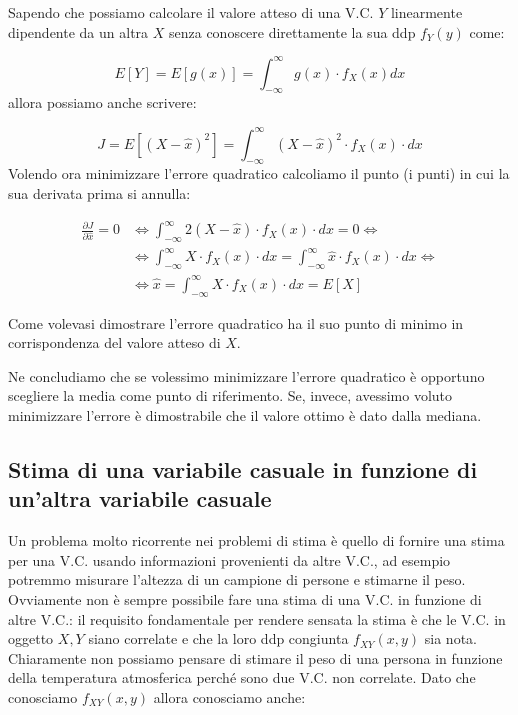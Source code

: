 \begin{dimostrazione}
Sapendo che possiamo calcolare il valore atteso di una V.C. $Y$ linearmente dipendente da un altra $X$ senza conoscere direttamente la sua ddp $f_Y(y)$ come:

  \[ E[Y]=E[g(x)]=\int_{-\infty}^{\infty} {g(x) \cdot f_X(x)dx}  \]
allora possiamo anche scrivere:

  \[ J=E\left[ (X-\hat{x})^2\right] = \int_{-\infty}^{ \infty }  {(X-\hat{x})^2 \cdot f_X(x) \cdot dx} \]
Volendo ora minimizzare l'errore quadratico calcoliamo il punto (i punti) in cui la sua derivata prima si annulla:

  \[ \begin{split}
      \frac{\partial J}{\partial\hat{x}}=0 & \Leftrightarrow  \int_{-\infty}^{ \infty }  {2(X-\hat{x}) \cdot f_X(x) \cdot dx}=0  \Leftrightarrow \\
      & \Leftrightarrow \int_{-\infty}^{ \infty }  {X \cdot f_X(x) \cdot dx}=\int_{-\infty}^{ \infty }  {\hat{x} \cdot f_X(x) \cdot dx}  \Leftrightarrow \\
      & \Leftrightarrow \hat{x}=\int_{-\infty}^{ \infty }  {X \cdot f_X(x) \cdot dx} = E[X]
    \end{split} 
  \]
  
Come volevasi dimostrare l'errore quadratico ha il suo punto di minimo in corrispondenza del valore atteso di $X$.
\end{dimostrazione}
Ne concludiamo che se volessimo minimizzare l'errore quadratico è opportuno scegliere la media come punto di riferimento. Se, invece, avessimo voluto minimizzare l'errore  è dimostrabile che il valore ottimo è dato dalla mediana.
\subsection{Stima di una variabile casuale in funzione di un'altra variabile casuale}
Un problema molto ricorrente nei problemi di stima è quello di fornire una stima per una V.C. usando informazioni provenienti da altre V.C., ad esempio potremmo misurare l'altezza di un campione di persone e stimarne il peso. Ovviamente non è sempre possibile fare una stima di una V.C. in funzione di altre V.C.: il requisito fondamentale per rendere sensata la stima è che le V.C. in oggetto $X,Y$ siano correlate e che la loro ddp congiunta $f_{XY}(x,y)$ sia nota. Chiaramente non possiamo pensare di stimare il peso di una persona in funzione della temperatura atmosferica perché sono due V.C. non correlate. Dato che conosciamo $f_{XY}(x,y)$ allora conosciamo anche:

